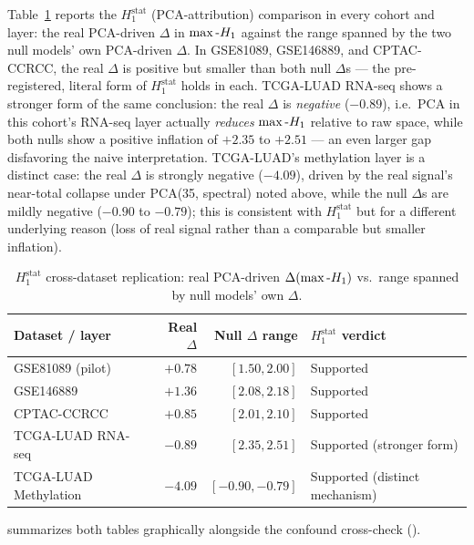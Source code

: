 Table~\ref{tab:h1-crossdataset} reports the $H_1^{\text{stat}}$ (PCA-attribution) comparison in every cohort and layer: the real PCA-driven $\Delta$ in $\max\text{-}H_1$ against the range spanned by the two null models' own PCA-driven $\Delta$. In GSE81089, GSE146889, and CPTAC-CCRCC, the real $\Delta$ is positive but smaller than both null $\Delta$s --- the pre-registered, literal form of $H_1^{\text{stat}}$ holds in each. TCGA-LUAD RNA-seq shows a stronger form of the same conclusion: the real $\Delta$ is \emph{negative} ($-0.89$), i.e.\ PCA in this cohort's RNA-seq layer actually \emph{reduces} $\max\text{-}H_1$ relative to raw space, while both nulls show a positive inflation of $+2.35$ to $+2.51$ --- an even larger gap disfavoring the naive interpretation. TCGA-LUAD's methylation layer is a distinct case: the real $\Delta$ is strongly negative ($-4.09$), driven by the real signal's near-total collapse under PCA(35, spectral) noted above, while the null $\Delta$s are mildly negative ($-0.90$ to $-0.79$); this is consistent with $H_1^{\text{stat}}$ but for a different underlying reason (loss of real signal rather than a comparable but smaller inflation).

\begin{table}[htbp]
\centering
\small
\caption{$H_1^{\text{stat}}$ cross-dataset replication: real PCA-driven $\Delta(\max\text{-}H_1)$ vs.\ range spanned by null models' own $\Delta$.}
\label{tab:h1-crossdataset}
\begin{tabular}{@{}lrrl@{}}
\toprule
Dataset / layer & Real $\Delta$ & Null $\Delta$ range & $H_1^{\text{stat}}$ verdict \\
\midrule
GSE81089 (pilot) & $+0.78$ & $[1.50, 2.00]$ & Supported \\
GSE146889 & $+1.36$ & $[2.08, 2.18]$ & Supported \\
CPTAC-CCRCC & $+0.85$ & $[2.01, 2.10]$ & Supported \\
TCGA-LUAD RNA-seq & $-0.89$ & $[2.35, 2.51]$ & Supported (stronger form) \\
TCGA-LUAD Methylation & $-4.09$ & $[-0.90, -0.79]$ & Supported (distinct mechanism) \\
\bottomrule
\end{tabular}
\end{table}

 summarizes both tables graphically alongside the confound cross-check ().

